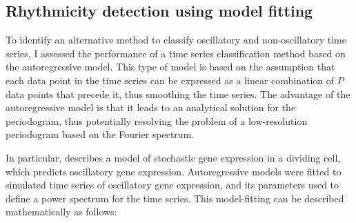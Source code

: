 \subsection{Rhythmicity detection using model fitting}
\label{subsec:analysis-classification-ar}

To identify an alternative method to classify oscillatory and non-oscillatory time series, I assessed the performance of a time series classification method based on the autoregressive model.
This type of model is based on the assumption that each data point in the time series can be expressed as a linear combination of $P$ data points that precede it, thus smoothing the time series.
The advantage of the autoregressive model is that it leads to an analytical solution for the periodogram, thus potentially resolving the problem of a low-resolution periodogram based on the Fourier spectrum.

In particular, \textcite{jiaFrequencyDomainAnalysis2021} describes a model of stochastic gene expression in a dividing cell, which predicts oscillatory gene expression.
Autoregressive models were fitted to simulated time series of oscillatory gene expression, and its parameters used to define a power spectrum for the time series.
This model-fitting can be described mathematically as follows:

